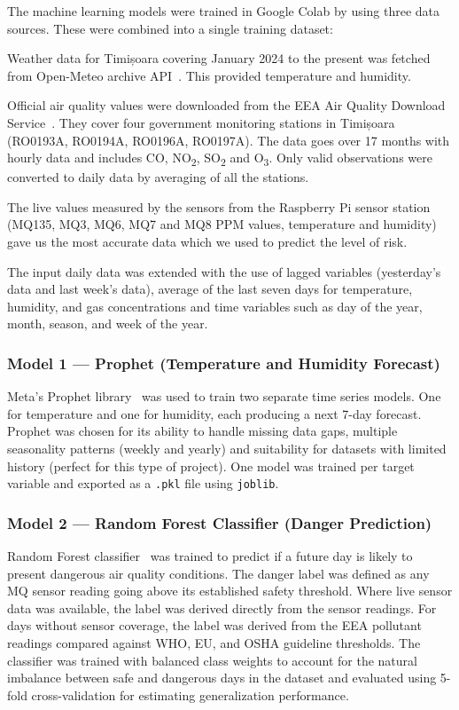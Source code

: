 The machine learning models were trained in Google Colab by using three data sources. These
were combined into a single training dataset:

Weather data for Timișoara covering January 2024 to the present was fetched from Open-Meteo
archive API~\cite{openmeteo}. This provided temperature and humidity.

Official air quality values were downloaded from the EEA Air Quality Download
Service~\cite{eea}. They cover four government monitoring stations in Timișoara (RO0193A,
RO0194A, RO0196A, RO0197A). The data goes over 17 months with hourly data and includes CO,
NO\textsubscript{2}, SO\textsubscript{2} and O\textsubscript{3}. Only valid observations were
converted to daily data by averaging of all the stations.

The live values measured by the sensors from the Raspberry Pi sensor station (MQ135, MQ3, MQ6,
MQ7 and MQ8 PPM values, temperature and humidity) gave us the most accurate data which we used
to predict the level of risk.

The input daily data was extended with the use of lagged variables (yesterday's data and last
week's data), average of the last seven days for temperature, humidity, and gas concentrations
and time variables such as day of the year, month, season, and week of the year.

\subsubsection{Model 1 — Prophet (Temperature and Humidity Forecast)}

Meta's Prophet library~\cite{prophet} was used to train two separate time series models. One
for temperature and one for humidity, each producing a next 7-day forecast. Prophet was chosen
for its ability to handle missing data gaps, multiple seasonality patterns (weekly and yearly)
and suitability for datasets with limited history (perfect for this type of project). One model
was trained per target variable and exported as a \texttt{.pkl} file using \texttt{joblib}.

\subsubsection{Model 2 — Random Forest Classifier (Danger Prediction)}

Random Forest classifier~\cite{sklearn} was trained to predict if a future day is likely to
present dangerous air quality conditions. The danger label was defined as any MQ sensor reading
going above its established safety threshold. Where live sensor data was available, the label
was derived directly from the sensor readings. For days without sensor coverage, the label was
derived from the EEA pollutant readings compared against WHO, EU, and OSHA guideline
thresholds. The classifier was trained with balanced class weights to account for the natural
imbalance between safe and dangerous days in the dataset and evaluated using 5-fold
cross-validation for estimating generalization performance.

